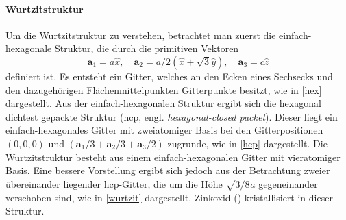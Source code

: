 \paragraph{Wurtzitstruktur}
Um die Wurtzitstruktur zu verstehen, betrachtet man zuerst die einfach-hexagonale Struktur, die durch die primitiven
Vektoren
\begin{equation}
    \mathbf{a}_1 = a\hat{x}, \quad
    \mathbf{a}_2 = a/2 (\hat{x} + \sqrt{3} \hat{y}), \quad
    \mathbf{a}_3 = c \hat{z}
    \label{eq:hex}
\end{equation}
definiert ist.
Es entsteht ein Gitter, welches an den Ecken eines Sechsecks und den dazugehörigen Flächenmittelpunkten Gitterpunkte
besitzt, wie in \cref{hex} dargestellt.
Aus der einfach-hexagonalen Struktur ergibt sich die hexagonal dichtest gepackte Struktur
(hcp, engl. \textit{hexagonal-closed packet}).
Dieser liegt ein einfach-hexagonales Gitter mit zweiatomiger Basis bei den Gitterpositionen $(0,0,0)$ und
$(\mathbf{a}_1/3 + \mathbf{a}_2/3 + \mathbf{a}_3/2)$ zugrunde, wie in \cref{hcp} dargestellt.\autocite[97-98]{Ashcroft}
Die Wurtzitstruktur besteht aus einem einfach-hexagonalen Gitter mit vieratomiger Basis.
Eine bessere Vorstellung ergibt sich jedoch aus der Betrachtung zweier übereinander liegender hcp-Gitter, die um
die Höhe $\sqrt {3 / 8} a$ gegeneinander verschoben sind, wie in \cref{wurtzit} dargestellt.
Zinkoxid () kristallisiert in dieser Struktur.\autocite[47-48]{Grundmann}

